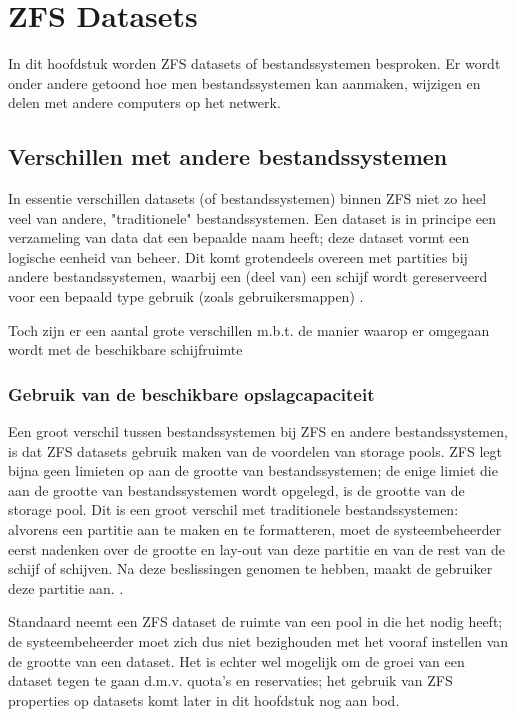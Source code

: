 

\chapter{ZFS Datasets}
\label{ch:h7}

In dit hoofdstuk worden ZFS datasets of bestandssystemen besproken. Er wordt onder andere getoond hoe men bestandssystemen kan aanmaken, wijzigen en delen met andere computers op het netwerk. 

\section{Verschillen met andere bestandssystemen}

In essentie verschillen datasets (of bestandssystemen) binnen ZFS niet zo heel veel van andere, "traditionele" bestandssystemen. Een dataset is in principe een verzameling van data dat een bepaalde naam heeft; deze dataset vormt een logische eenheid van beheer. Dit komt grotendeels overeen met partities bij andere bestandssystemen, waarbij een (deel van) een schijf wordt gereserveerd voor een bepaald type gebruik (zoals gebruikersmappen) \autocite{Lucas2015}.

Toch zijn er een aantal grote verschillen m.b.t. de manier waarop er omgegaan wordt met de beschikbare schijfruimte

\subsection{Gebruik van de beschikbare opslagcapaciteit}

Een groot verschil tussen bestandssystemen bij ZFS en andere bestandssystemen, is dat ZFS datasets gebruik maken van de voordelen van storage pools. ZFS legt bijna geen limieten op aan de grootte van bestandssystemen; de enige limiet die aan de grootte van bestandssystemen wordt opgelegd, is de grootte van de storage pool. Dit is een groot verschil met traditionele bestandssystemen: alvorens een partitie aan te maken en te formatteren, moet de systeembeheerder eerst nadenken over de grootte en lay-out van deze partitie en van de rest van de schijf of schijven. Na deze beslissingen genomen te hebben, maakt de gebruiker deze partitie aan. \autocite{Lucas2015}.

Standaard neemt een ZFS dataset de ruimte van een pool in die het nodig heeft; de systeembeheerder moet zich dus niet bezighouden met het vooraf instellen van de grootte van een dataset. Het is echter wel mogelijk om de groei van een dataset tegen te gaan d.m.v. quota's en reservaties; het gebruik van ZFS properties op datasets komt later in dit hoofdstuk nog aan bod. 

